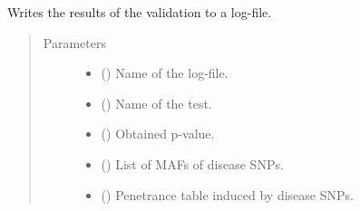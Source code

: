 \documentclass[a4paper,10pt,english]{sphinxhowto}
\begin{document}
\begin{fulllineitems}
\label{\detokenize{utils:utils.validation_utils.write_to_log_file}}
Writes the results of the validation to a log-file.
\begin{quote}\begin{description}
\item[{Parameters}] \leavevmode\begin{itemize}
\item {} 
 () \textendash{} Name of the log-file.

\item {} 
 () \textendash{} Name of the test.

\item {} 
 () \textendash{} Obtained p-value.

\item {} 
 () \textendash{} List of MAFs of disease SNPs.

\item {} 
 () \textendash{} Penetrance table induced by disease SNPs.

\end{itemize}

\end{description}\end{quote}

\end{fulllineitems}
\end{document}

